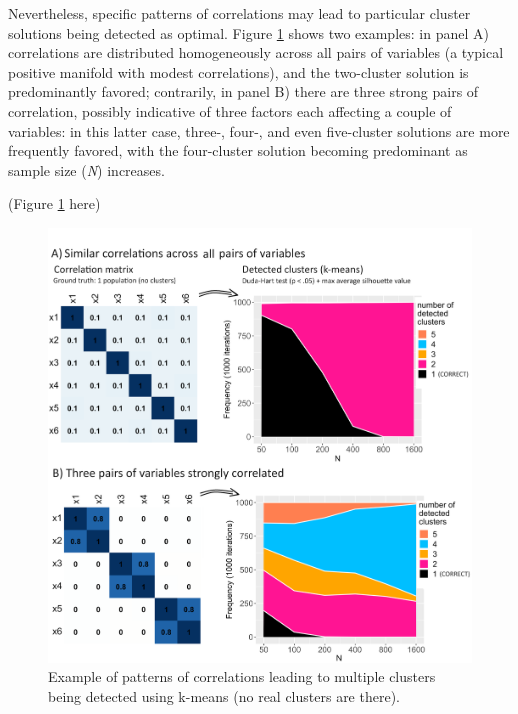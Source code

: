 \documentclass[
  man,floatsintext]{apa7}
\begin{document}
Nevertheless, specific patterns of correlations may lead to particular cluster solutions being detected as optimal. Figure \ref{fig:figure-matrix-correlation} shows two examples: in panel A) correlations are distributed homogeneously across all pairs of variables (a typical positive manifold with modest correlations), and the two-cluster solution is predominantly favored; contrarily, in panel B) there are three strong pairs of correlation, possibly indicative of three factors each affecting a couple of variables: in this latter case, three-, four-, and even five-cluster solutions are more frequently favored, with the four-cluster solution becoming predominant as sample size (\emph{N}) increases.

(Figure \ref{fig:figure-matrix-correlation} here)

\begin{figure}

{\centering \includegraphics[width=1\linewidth]{figures_external/Figure_matrix_correlation_REDUCED2} 

}

\caption{Example of patterns of correlations leading to multiple clusters being detected using k-means (no real clusters are there).}\label{fig:figure-matrix-correlation}
\end{figure}
\end{document}
